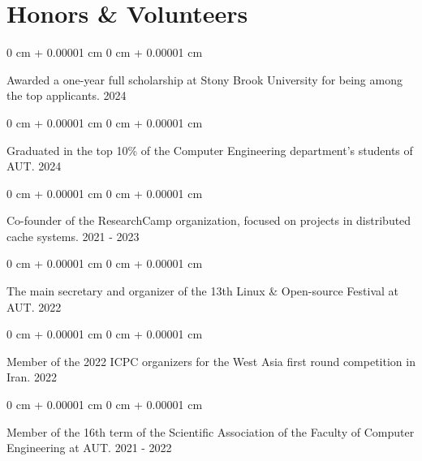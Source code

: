 \documentclass[10pt, letterpaper]{article}
\newenvironment{onecolentry}{
    \begin{adjustwidth}{
        0 cm + 0.00001 cm
    }{
        0 cm + 0.00001 cm
    }
}{
    \end{adjustwidth}
} %
\begin{document}
    \section{Honors \& Volunteers}
        \begin{onecolentry}
            Awarded a one-year full scholarship at Stony Brook University for being among the top applicants. \hfill 2024
        \end{onecolentry}
        \vspace{0.1 cm}
        \begin{onecolentry}
            Graduated in the top 10\% of the Computer Engineering department's students of AUT. \hfill 2024
        \end{onecolentry}
        \vspace{0.1 cm}
        \begin{onecolentry}
            Co-founder of the ResearchCamp organization, focused on projects in distributed cache systems. \hfill 2021 - 2023
        \end{onecolentry}
        \vspace{0.1 cm}
        \begin{onecolentry}
            The main secretary and organizer of the 13th Linux \& Open-source Festival at AUT. \hfill 2022
        \end{onecolentry}
        \vspace{0.1 cm}
        \begin{onecolentry}
            Member of the 2022 ICPC organizers for the West Asia first round competition in Iran. \hfill 2022
        \end{onecolentry}
        \vspace{0.1 cm}
        \begin{onecolentry}
            Member of the 16th term of the Scientific Association of the Faculty of Computer Engineering at AUT. \hfill 2021 - 2022
        \end{onecolentry}
\end{document}
